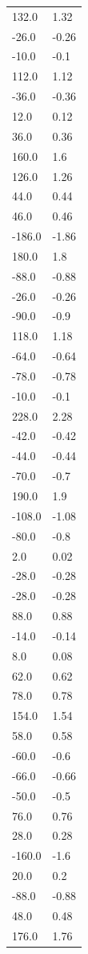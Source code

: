 \begin{longtable}{ll}
132.0 & 1.32 \\
-26.0 & -0.26 \\
-10.0 & -0.1 \\
112.0 & 1.12 \\
-36.0 & -0.36 \\
12.0 & 0.12 \\
36.0 & 0.36 \\
160.0 & 1.6 \\
126.0 & 1.26 \\
44.0 & 0.44 \\
46.0 & 0.46 \\
-186.0 & -1.86 \\
180.0 & 1.8 \\
-88.0 & -0.88 \\
-26.0 & -0.26 \\
-90.0 & -0.9 \\
118.0 & 1.18 \\
-64.0 & -0.64 \\
-78.0 & -0.78 \\
-10.0 & -0.1 \\
228.0 & 2.28 \\
-42.0 & -0.42 \\
-44.0 & -0.44 \\
-70.0 & -0.7 \\
190.0 & 1.9 \\
-108.0 & -1.08 \\
-80.0 & -0.8 \\
2.0 & 0.02 \\
-28.0 & -0.28 \\
-28.0 & -0.28 \\
88.0 & 0.88 \\
-14.0 & -0.14 \\
8.0 & 0.08 \\
62.0 & 0.62 \\
78.0 & 0.78 \\
154.0 & 1.54 \\
58.0 & 0.58 \\
-60.0 & -0.6 \\
-66.0 & -0.66 \\
-50.0 & -0.5 \\
76.0 & 0.76 \\
28.0 & 0.28 \\
-160.0 & -1.6 \\
20.0 & 0.2 \\
-88.0 & -0.88 \\
48.0 & 0.48 \\
176.0 & 1.76 \\

\end{longtable}
